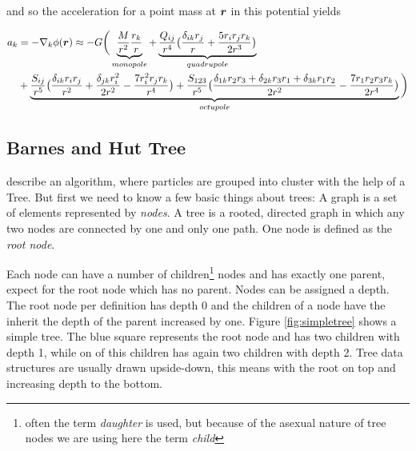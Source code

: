 and so the acceleration for a point mass at $\boldsymbol{r}$ in this potential yields

\begin{align}
\label{ch02_grav02_eq011}
a_{k} &= - \nabla_{k} \phi(\boldsymbol{r}) \approx - G \bigg(
\underbrace{ \frac{M}{r^{2}} \frac{r_{k}}{r} }_{monopole}+ 
\underbrace{ \frac{Q_{i j}}{r^{4}}
\big( \frac{\delta_{i k} r_{j} }{r} + \frac{5 r_{i} r_{j} r_{k} }{2r^{3}} \big)
}_{quadrupole} \nonumber \\
&+ \underbrace{ \frac{S_{i j}}{r^{5}}
\big( \frac{ \delta_{i k} r_{i} r_{j} }{r^{2}}
+ \frac{ \delta_{j k} r_{i}^{2} }{2 r^{2} }
- \frac{7 r_{i}^{2} r_{j} r_{k} }{r^{4} } \big) 
 + \frac{S_{1 2 3}}{r^{5} }
\big( \frac{\delta_{1 k} r_{2} r_{3} + \delta_{2 k} r_{3} r_{1} + \delta_{3 k} r_{1} r_{2}}{2 r^{2}} 
- \frac{7 r_{1} r_{2} r_{3} r_{k} }{2 r^{4}}\big) 
}_{octupole}
\bigg)
\end{align}

\subsection{Barnes and Hut Tree}
\cite{Barnes:1986p2853} describe an algorithm, where particles are grouped into cluster with the help of a Tree. But first we need to know a few basic things about trees: A graph is a set of elements represented by \emph{nodes}. A tree is a rooted, directed graph in which any two nodes are connected by one and only one path. One node is defined as the \emph{root node}.

Each node can have a number of children\footnote{often the term \emph{daughter} is used, but because of the asexual nature of tree nodes we are using here the term \emph{child}} 
nodes and has exactly one parent, expect for the root node which has no parent. Nodes can be assigned a depth. The root node per definition has depth $0$ and the children of a node have the inherit the depth of the parent increased by one. Figure \ref{fig:simpletree} shows a simple tree. The blue square represents the root node and has two children with depth 1, while on of this children has again two children with depth 2. Tree data structures are usually drawn upside-down, this means with the root on top and increasing depth to the bottom.


